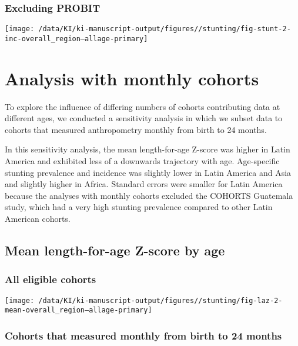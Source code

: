 \documentclass[
  9pt,
]{book}
\begin{document}
\hypertarget{excluding-probit-2}{%
\subsection{Excluding PROBIT}\label{excluding-probit-2}}

\texttt{[image: /data/KI/ki-manuscript-output/figures//stunting/fig-stunt-2-inc-overall\_region--allage-primary]}

\hypertarget{monthly}{%
\chapter{Analysis with monthly cohorts}\label{monthly}}

\raggedright

To explore the influence of differing numbers of cohorts contributing data at different ages, we conducted a sensitivity analysis in which we subset data to cohorts that measured anthropometry monthly from birth to 24 months.

In this sensitivity analysis, the mean length-for-age Z-score was higher in Latin America and exhibited less of a downwards trajectory with age. Age-specific stunting prevalence and incidence was slightly lower in Latin America and Asia and slightly higher in Africa. Standard errors were smaller for Latin America because the analyses with monthly cohorts excluded the COHORTS Guatemala study, which had a very high stunting prevalence compared to other Latin American cohorts.

\hypertarget{mean-length-for-age-z-score-by-age-2}{%
\section{Mean length-for-age Z-score by age}\label{mean-length-for-age-z-score-by-age-2}}

\hypertarget{all-eligible-cohorts}{%
\subsection{All eligible cohorts}\label{all-eligible-cohorts}}

\texttt{[image: /data/KI/ki-manuscript-output/figures//stunting/fig-laz-2-mean-overall\_region--allage-primary]}

\hypertarget{cohorts-that-measured-monthly-from-birth-to-24-months}{%
\subsection{Cohorts that measured monthly from birth to 24 months}\label{cohorts-that-measured-monthly-from-birth-to-24-months}}
\end{document}
